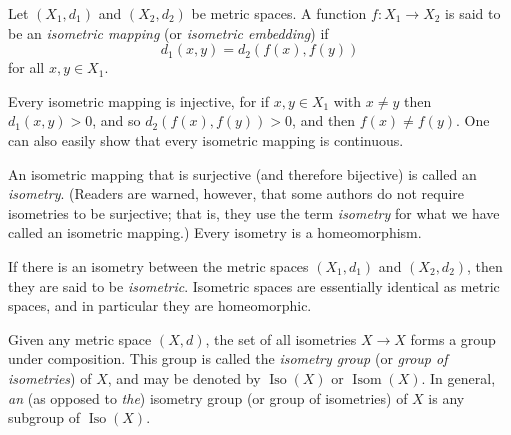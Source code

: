\documentclass[12pt]{article}
\def\Iso{\operatorname{Iso}}
\def\Isom{\operatorname{Isom}}
\begin{document}

Let $(X_1,d_1)$ and $(X_2,d_2)$ be metric spaces.
A function $f\colon X_1\to X_2$ is said to be an \emph{isometric mapping}
(or \emph{isometric embedding}) if
\[
  d_1(x,y)=d_2(f(x),f(y))
\]
for all $x,y\in X_1$.

Every isometric mapping is injective,
for if $x,y\in X_1$ with $x\neq y$ then $d_1(x,y)>0$,
and so $d_2(f(x),f(y))>0$, and then $f(x)\neq f(y)$.
One can also easily show that every isometric mapping is continuous.

An isometric mapping that is surjective (and therefore bijective)
is called an \emph{isometry}. 
(Readers are warned, however,
that some authors do not require isometries to be surjective;
that is, they use the term {\it isometry}
for what we have called an isometric mapping.)
Every isometry is a homeomorphism.

If there is an isometry between the metric spaces $(X_1,d_1)$ and $(X_2,d_2)$,
then they are said to be \emph{isometric}.
Isometric spaces are essentially identical as metric spaces,
and in particular they are homeomorphic.

Given any metric space $(X,d)$,
the set of all isometries $X\to X$ forms a group under composition.
This group is called the \emph{isometry group}
(or \emph{group of isometries}) of $X$,
and may be denoted by $\Iso(X)$ or $\Isom(X)$.
In general, {\it an} (as opposed to {\it the}) isometry group 
(or group of isometries) of $X$ is any subgroup of $\Iso(X)$.
\end{document}
